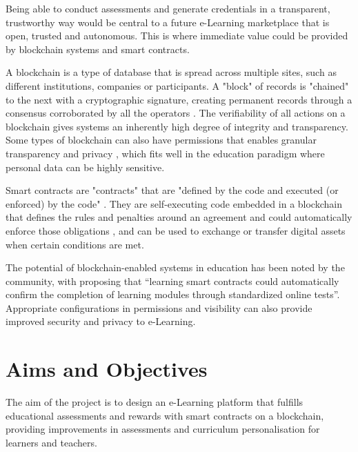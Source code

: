 Being able to conduct assessments and generate credentials in a transparent, trustworthy way would be central to 
a future e-Learning marketplace that is open, trusted and autonomous.
This is where immediate value could be provided by blockchain systems and smart contracts.

A blockchain is a type of database that is spread across multiple sites, such as different institutions, companies 
or participants. A "block" of records is "chained" to the next with a cryptographic signature, creating permanent records 
through a consensus corroborated by all the operators \citep[p.17]{walport2016distributed}.
The verifiability of all actions on a blockchain gives systems an inherently high degree of integrity and transparency. 
Some types of blockchain can also have permissions that enables granular transparency and privacy \citep[p.22]{walport2016distributed}, 
which fits well in the education paradigm where personal data can be highly sensitive.

Smart contracts are "contracts" that are "defined by the code and executed (or enforced) by the code" \citep[p.16]{swan2015blockchain}.
They are self-executing code embedded in a blockchain that defines the rules and penalties around an agreement and could automatically enforce 
those obligations \citep{gulhane2017ibm}, and can be used to exchange or transfer digital assets when certain conditions are met. 

The potential of blockchain-enabled systems in education has been noted by the community, with \citet[p.62]{swan2015blockchain} 
proposing that “learning smart contracts could automatically confirm the completion of learning modules through standardized 
online tests”. Appropriate configurations in permissions and visibility can also provide improved security and privacy to e-Learning.

\section{Aims and Objectives} %

The aim of the project is to design an e-Learning platform that fulfills educational assessments and 
rewards with smart contracts on a blockchain, providing improvements in assessments and curriculum 
personalisation for learners and teachers.

